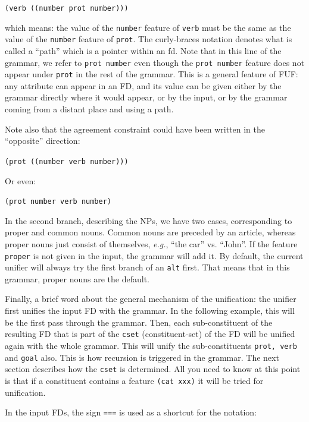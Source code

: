 \documentclass[10pt,a4paper]{report}
\begin{document}
{\tt (verb ((number {prot number})))}

which means: the value of the {\tt number} feature of {\tt verb} must be
the same as the value of the {\tt number} feature of {\tt prot}.  The
curly-braces notation denotes what is called a ``path'' which is a pointer
within an fd.  Note that in this line of the grammar, we refer to {\tt {prot
number}} even though the {\tt {prot number}} feature does not appear under
{\tt prot} in the rest of the grammar.  This is a general feature of FUF: any
attribute can appear in an FD, and its value can be given either by the
grammar directly where it would appear, or by the input, or by the grammar
coming from a distant place and using a path.  

Note also that the agreement constraint could have been written in the
``opposite'' direction:

{\tt (prot ((number {verb number})))}

Or even:

{\tt ({prot number} {verb number})}

In the second branch, describing the NPs, we have two cases,
corresponding to proper and common nouns. Common nouns are
preceded by an article, whereas proper nouns just consist of
themselves, {\em e.g.}, ``the car'' vs. ``John''. If the feature {\tt proper} is
not given in the input, the grammar will add it. By default, the
current unifier will always try the first branch of an {\tt alt} first.
That means that in this grammar, proper nouns are the default.
  

Finally, a brief word about the general mechanism of the
unification: the unifier first unifies the input FD with the
grammar. In the following example, this will be the first pass
through the grammar. Then, each sub-constituent of the resulting
FD that is part of the {\tt cset} (constituent-set) of the FD will be
unified again with the whole grammar. This will unify the
sub-constituents {\tt prot, verb} and {\tt goal} also. This is how recursion
is triggered in the grammar. The next section describes how the
{\tt cset} is determined. All you need to know at this point is that if
a constituent contains a feature {\tt (cat xxx)} it will be tried for
unification. 
 
 

In the input FDs, the sign {\tt ===} is used as a shortcut for the
notation: 
\end{document}
